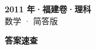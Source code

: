 \documentclass[zihao=-4, a4paper]{ctexart}
\begin{document}
\begin{center}
  {\Large\bfseries 2011 年·福建卷·理科}\\[4pt]
  {\large 数学 · 简答版}
\end{center}
\medskip
{}

\clearpage
{}
\begin{center}{\Large\bfseries 答案速查}\end{center}
\medskip

\end{document}
